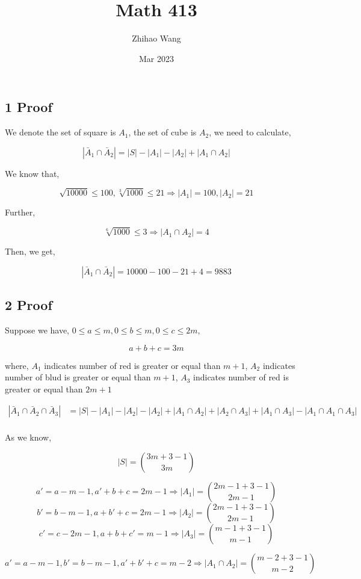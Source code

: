 \documentclass{article}
\title{Math 413}
\author{Zhihao Wang}
\date{Mar 2023}
\def\implies{\Longrightarrow}
\begin{document}
\maketitle

\subsection*{1 Proof}

We denote the set of square is $A_1$, the set of cube is $A_2$, we need to calculate,

$$|\bar A_1 \cap \bar A_2| =  |S|  - |A_1| - |A_2| + |A_1 \cap A_2|$$

We know that, 

$$\sqrt{10000} \le 100, \sqrt[3]{1000} \le 21 \implies |A_1| = 100, |A_2| = 21$$

Further, 

$$\sqrt[6]{1000} \le 3 \implies |A_1 \cap A_2| = 4$$

Then, we get,

$$|\bar A_1 \cap \bar A_2| = 10000 - 100 - 21 + 4 = 9883$$

\subsection*{2 Proof}

Suppose we have, $ 0 \le a \le m, 0 \le b \le m, 0 \le c \le 2m$, 

$$a + b + c = 3m$$

where, $A_1$ indicates number of red is greater or equal than $m + 1$, $A_2 $ indicates number of blud is greater or equal than $m + 1$, $A_3$ indicates number of red is greater or equal than $2m + 1$

\[
\begin{split}
|\bar A_1 \cap \bar A_2 \cap \bar A_3| &= |S| - |A_1| - |A_2| - |A_2| + |A_1 \cap A_2| + |A_2 \cap A_3| + |A_1 \cap A_3| - |A_1 \cap A_1 \cap A_3| \\
\end{split}
\]

As we know,

$$|S| = {3m + 3 - 1 \choose 3m}$$

$$a' = a - m - 1, a' + b + c = 2m - 1 \implies |A_1| = {2m - 1 + 3 - 1 \choose 2m - 1}$$
$$b' = b - m - 1, a + b' + c = 2m - 1 \implies |A_2| = {2m - 1 + 3 - 1 \choose 2m - 1}$$
$$c' = c - 2m - 1, a + b + c' = m - 1 \implies |A_3| = {m - 1 + 3 - 1 \choose m - 1}$$

$$a' = a - m - 1, b' = b - m - 1, a' + b' + c = m - 2 \implies |A_1 \cap A_2| = {m - 2 + 3 - 1 \choose m - 2}$$
\end{document}
